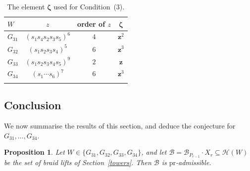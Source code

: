 \documentclass[11pt, reqno]{amsart}
\numberwithin{equation}{section}
\newtheorem{proposition}[theorem]{Proposition}
\theoremstyle{remark}
\begin{document}
\begin{table}[h]
	\centering
	\begin{tabular}{lccc}
		\hline
		$W$ & $z$ & order of $z$ & $\boldsymbol\zeta$\\
		\hline
		$G_{31}$ & $(s_1s_4s_2s_3s_5)^6$ & $4$ & $\mathbf z^2$\\
		$G_{32}$ & $(s_1s_2s_3s_4)^5$ & $6$ & $\mathbf z^3$\\
		$G_{33}$ & $(s_1s_2s_3s_4s_5)^9$ & $2$ & $\mathbf z$\\
		$G_{34}$ & $(s_1\cdots s_6)^7$ & $6$ & $\mathbf z^3$\\
		\hline
		& &  &\\
	\end{tabular}
	\caption{The  element $\boldsymbol\zeta$  used for Condition~(3).}
	\label{tab:zeta}
\end{table}
\subsection{Conclusion}\label{subsec:concl5}
We now summarise the results of this section, and deduce the conjecture for $G_{31},\dots,G_{34}$.

\begin{proposition}\label{prop:top}
	Let $W\in\{G_{31},G_{32},G_{33},G_{34}\}$, and let
	$\mathcal B=\mathcal B_{P_{r-1}}\cdot X_r\subseteq\mathcal H(W)$ be the
	set of braid lifts of Section~\ref{towers}. Then $\mathcal B$ is
	$\mathrm{pr}$-admissible.
\end{proposition}
\end{document}
